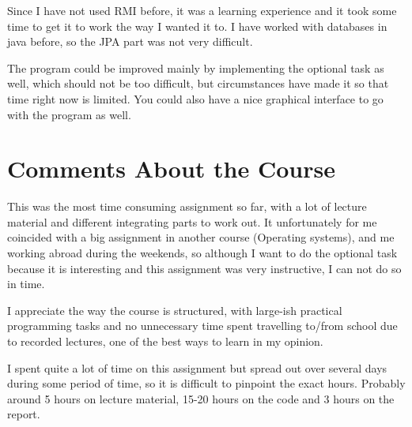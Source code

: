 \documentclass[a4paper]{scrartcl}
\begin{document}
Since I have not used RMI before, it was a learning experience and it took some time to get it to work the way I wanted it to. I have worked with databases in java before, so the JPA part was not very difficult.

The program could be improved mainly by implementing the optional task as well, which should not be too difficult, but circumstances have made it so that time right now is limited. You could also have a nice graphical interface to go with the program as well.


\section{Comments About the Course}

This was the most time consuming assignment so far, with a lot of lecture material and different integrating parts to work out. It unfortunately for me coincided with a big assignment in another course (Operating systems), and me working abroad during the weekends, so although I want to do the optional task because it is interesting and this assignment was very instructive, I can not do so in time.

I appreciate the way the course is structured, with large-ish practical programming tasks and no unnecessary time spent travelling to/from school due to recorded lectures, one of the best ways to learn in my opinion.

I spent quite a lot of time on this assignment but spread out over several days during some period of time, so it is difficult to pinpoint the exact hours. Probably around 5 hours on lecture material, 15-20 hours on the code and 3 hours on the report.
\end{document}
